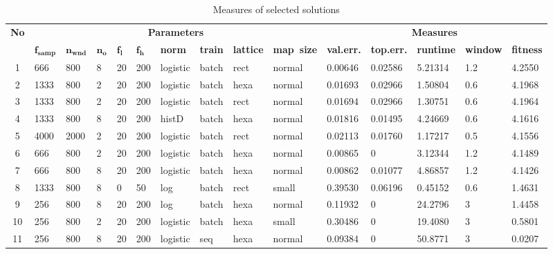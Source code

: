 \documentclass[a4paper,jurnal]{IEEEtran}
\begin{document}
\begin{table}[b]
\caption{Measures of selected solutions}
		\begin{tabular}{|c||p{8mm}|p{8mm}|p{4mm}|p{4mm}|m{5mm} |p{8.5mm}|p{7mm}|p{8mm}|p{11mm} ||p{10mm}|p{10mm}|p{10mm}|p{10mm}|p{10mm}|}
			\hline
				\multirow{2}{*}{\textbf{No}} & 
				\multicolumn{9}{c||}{\textbf{Parameters}} & 
				\multicolumn{5}{c|}{\textbf{Measures}} \\
			\cline{2-15}
				&
				$ \mathbf{f_{samp}} $& 
				$ \mathbf{n_{wnd}} $& 
				$ \mathbf{n_o} $&
				$ \mathbf{f_l} $&
				$ \mathbf{f_h} $& 
				\textbf{norm}&
				\textbf{train}&
				\textbf{lattice} &
				\textbf{map~size} &
				\textbf{val.err.}&
				\textbf{top.err.}&
				\textbf{runtime}&
				\textbf{window}& 
				\textbf{fitness}\\
			\hline\hline
1 & 666 & 800 & 8 & 20 & 200 & logistic & batch & rect & normal & 0.00646 &  0.02586 &  5.21314 &  1.2 & 4.2550 \\ \hline
2 & 1333 & 800 & 2 & 20 & 200 & logistic & batch & hexa & normal &  0.01693 &  0.02966 &  1.50804 &  0.6 & 4.1968 \\ \hline
3 & 1333 & 800 & 2 & 20 & 200 & logistic & batch & rect & normal &  0.01694 &  0.02966 &  1.30751 &  0.6 & 4.1964 \\ \hline
4 & 1333 & 800 & 8 & 20 & 200 & histD & batch & hexa & normal &  0.01816 &  0.01495 &  4.24669 &  0.6 & 4.1616 \\ \hline
5 & 4000 & 2000 & 2 & 20 & 200 & logistic & batch & rect & normal &  0.02113 & 0.01760 &  1.17217 &  0.5 & 4.1556 \\ \hline
6 & 666 & 800 & 2 & 20 & 200 & logistic & batch & hexa & normal &  0.00865 &   0 &  3.12344 &  1.2 &   4.1489 \\ \hline
7 & 666 & 800 & 8 & 20 & 200 & logistic & batch & hexa & normal &  0.00862 &  0.01077 &  4.86857 &  1.2 &  4.1426 \\ \hline
8 & 1333 & 800 & 8 &  0 & 50 & log & batch & rect & small  &  0.39530 &  0.06196 &  0.45152 &  0.6 &   1.4631 \\ \hline
9 & 256 & 800 & 8 & 20 & 200 & log & batch & hexa & normal &   0.11932 &    0 &  24.2796 &    3 &   1.4458 \\ \hline
10 & 256 & 800 & 2 & 20 & 200 & logistic & batch & hexa & small &   0.30486 &    0 &   19.4080 &    3 &  0.5801 \\ \hline
11 & 256 & 800 & 8 & 20 & 200 & logistic & seq & hexa & normal  &  0.09384 &   0 &  50.8771 &    3 & 0.0207 \\ \hline
\end{tabular}
\label{tbl:somresults}
\end{table}
\end{document}

